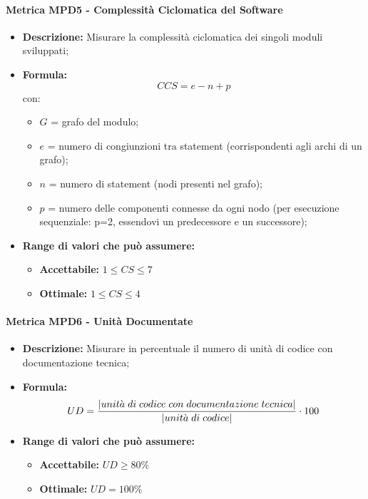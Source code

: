 \paragraph{Metrica MPD5 - Complessità Ciclomatica del Software} 
    \begin{itemize}
    \item \textbf{Descrizione:} Misurare la complessità ciclomatica dei singoli moduli sviluppati;
 \item \textbf{Formula:} $$CCS = e - n + p$$
    con:
    \begin{itemize}
        \item $G$ = grafo del modulo;
        \item $e$ = numero di congiunzioni tra statement (corrispondenti agli archi di un grafo);
        \item $n$ = numero di statement (nodi presenti nel grafo);
        \item $p$ = numero delle componenti connesse da ogni nodo (per esecuzione sequenziale: p=2, essendovi un predecessore e un successore);
    \end{itemize}
    \item \textbf{Range di valori che può assumere:}
    \begin{itemize}
        \item \textbf{Accettabile:} $1 \leq CS \leq 7 $
        \item \textbf{Ottimale:} $ 1 \leq CS \leq 4 $
    \end{itemize}
\end{itemize}

\paragraph{Metrica MPD6 - Unità Documentate} 
\begin{itemize}
    \item \textbf{Descrizione:} Misurare in percentuale il numero di unità di codice con documentazione tecnica;
  \item \textbf{Formula:} $$UD = {|unit\grave{a} \; di \; codice \; con \; documentazione \; tecnica| \over |unit\grave{a} \; di \; codice|} \cdot 100$$
    \item \textbf{Range di valori che può assumere:}
    \begin{itemize}
        \item \textbf{Accettabile:} $UD \geq 80\%  $
        \item \textbf{Ottimale:} $UD = 100\%$
    \end{itemize}
\end{itemize}
              
